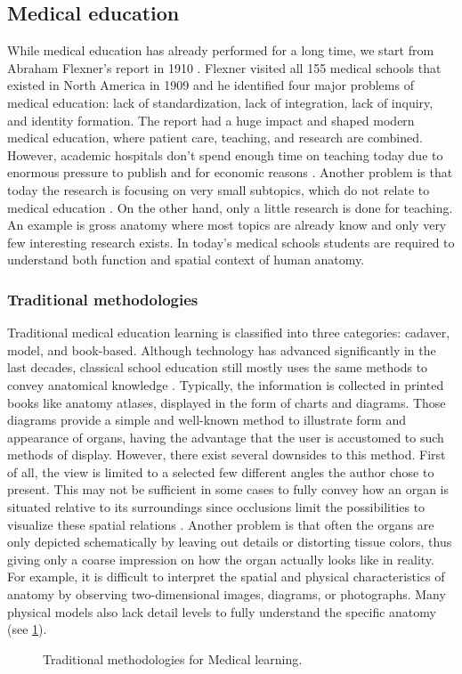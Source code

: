 \subsection{Medical education}
While medical education has already performed for a long time, we start from Abraham Flexner's report in 1910 \citep{Flexner1910}. Flexner visited all 155 medical schools that existed in North America in 1909 and he identified four major problems of medical education: lack of standardization, lack of integration, lack of inquiry, and identity formation. The report had a huge impact and shaped modern medical education, where patient care, teaching, and research are combined. However, academic hospitals don't spend enough time on teaching today due to enormous pressure to publish and for economic reasons \cite{Saidi2007}. Another problem is that today the research is focusing on very small subtopics, which do not relate to medical education \cite{Ludmerer2003}. On the other hand, only a little research is done for teaching. An example is gross anatomy where most topics are already know and only very few interesting research exists.
In today's medical schools students are required to understand both function and spatial context of human anatomy. 

\subsubsection{Traditional methodologies} 
Traditional medical education learning is classified into three categories: cadaver, model, and book-based. Although technology has advanced significantly in the last decades, classical school education still mostly uses the same methods to convey anatomical knowledge \cite{Dunnill2013}. Typically, the information is collected in printed books like anatomy atlases, displayed in the form of charts and diagrams. Those diagrams provide a simple and well-known method to illustrate form and appearance of organs, having the advantage that the user is accustomed to such methods of display. However, there exist several downsides to this method. First of all, the view is limited to a selected few different angles the author chose to present. This may not be sufficient in some cases to fully convey how an organ is situated relative to its surroundings since occlusions limit the possibilities to visualize these spatial relations \cite{AGilroyBMacpherson2012}. Another problem is that often the organs are only depicted schematically by leaving out details or distorting tissue colors, thus giving only a coarse impression on how the organ actually looks like in reality.
For example, it is difficult to interpret the spatial and physical characteristics of anatomy by observing two-dimensional images, diagrams, or photographs. Many physical models also lack detail levels to fully understand the specific anatomy (see \figurename{\ref{fig:2-bg:traditionalMethods}}). 
\begin{figure}
	\centering
	\caption{Traditional methodologies for Medical learning.}
	\label{fig:2-bg:traditionalMethods}
\end{figure}

